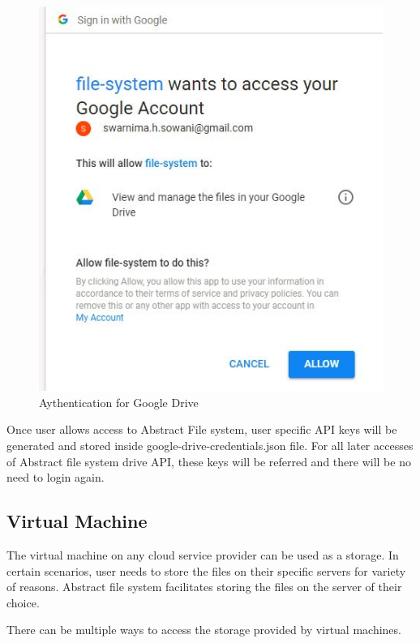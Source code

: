 \begin{figure}[!ht]
        \centering\includegraphics[width=\columnwidth]
        {image/auth.JPG}
        \caption{Aythentication for Google Drive}\label{fig:auth}
\end{figure}


Once user allows access to Abstract File system, user specific API
keys will be generated and stored inside google-drive-credentials.json
file.  For all later accesses of Abstract file system drive API, these
keys will be referred and there will be no need to login again.


\subsection{Virtual Machine}

The virtual machine on any cloud service provider can be used as a
storage. In certain scenarios, user needs to store the files on their
specific servers for variety of reasons. Abstract file system
facilitates storing the files on the server of their choice.

There can be multiple ways to access the storage provided by virtual
machines.

